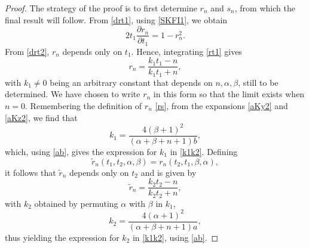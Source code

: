 \documentclass[10pt, reqno]{amsart}
\numberwithin{equation}{section}
\numberwithin{equation}{section}
\begin{document}
\begin{proof}
The strategy of the proof is to first determine $r_n$ and $s_n$, from which the final result will follow. From \eqref{drt1}, using \eqref{SKFI1}, we obtain 
\begin{equation} 
2t_1\frac{\partial r_n}{\partial t_1}=1-r_n^2.\label{rt1}
\end{equation}
From \eqref{drt2}, $r_n$ depends only on $t_1$. Hence, integrating \eqref{rt1} gives
\begin{equation}
r_n=\frac{k_1t_1-n}{k_1t_1+n},\label{solr}
\end{equation}
with $k_1\neq 0$ being an arbitrary constant that depends on $n,\alpha, \beta$, still to be determined. We have chosen to write $r_n$ in this form so that the limit exists when $n=0$. Remembering the definition of $r_n$ \eqref{rs}, from the expansions \eqref{aKy2} and \eqref{aKz2}, we find that
\begin{equation} \label{k1}
k_1=\frac{4(\beta+1)^2}{(\alpha+\beta+n+1)b},
\end{equation} 
which, using \eqref{ab}, gives the expression for $k_1$ in \eqref{k1k2}. Defining
\begin{equation*}
\tilde{r}_n(t_1,t_2,\alpha,\beta)=r_n(t_2,t_1,\beta,\alpha),
\end{equation*}
it follows that $\tilde{r}_n$ depends only on $t_2$ and is given by
\begin{equation}\label{trt2}
\tilde{r}_n=\frac{k_2t_2-n}{k_2t_2+n},
\end{equation}
with $k_2$ obtained by permuting $\alpha$ with $\beta$ in $k_1$,
\begin{equation}\label{k2}
k_2=\frac{4(\alpha+1)^2}{(\alpha+\beta+n+1)a},
\end{equation}
thus yielding the expression for $k_2$ in \eqref{k1k2}, using \eqref{ab}.


\end{proof}
\end{document}
